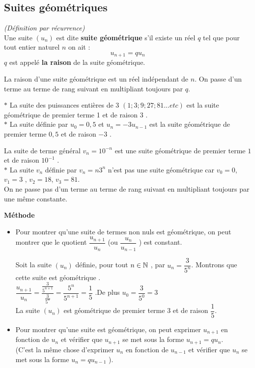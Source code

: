    \subsection{Suites géométriques}
  \begin{definition}
 \textsl{(Définition par récurrence)}\\
Une suite $(u_{n})$ est dite   \textbf{suite géométrique} s'il existe un réel $ q $ tel que   pour tout entier naturel $n$ on ait :  \[u_{n+1}=qu_{n} \]
$q$ est appelé  \textbf{la raison} de la suite géométrique.
\end{definition}
\begin{remark}
La raison d'une suite géométrique est un réel indépendant de $ n. $ On passe d'un terme au terme de rang suivant en multipliant toujours  par $ q. $ 
\end{remark}
\begin{example}

$ \ast $ La suite des  puissances entières de 3 $ (1;3;9;27;81...etc) $ est la suite géométrique  de premier terme 1 et de raison 3 .\\
$ \ast $ La suite définie  par  $ u_{0}=0,5 $ et $ u_{n}=-3u_{n-1} $ est la suite géométrique  de premier terme $0,5   $ et de raison $ -3 $ .
\item La suite de terme général $ v_{n}=10^{-n} $ est une suite géométrique de premier terme $1$ et de raison $ 10^{-1} $ .\\
$ \ast $ La suite $ v_{n} $  définie par $ v_{n}= n3^{n} $ n'est pas une suite géométrique  car $ v_{0}=0$, $v_{1}=3 $ , $v_{2}=18 $, $v_{3}=81 $.\\                                    On ne passe pas d'un terme au terme de rang suivant en multipliant toujours  par une  même constante.

\end{example}
\textbf{Méthode} 
\begin{itemize}
\item [\textbullet] Pour montrer qu'une suite de termes non nuls est géométrique, on peut  montrer que le quotient $ \dfrac{u_{n+1}}{u_{n}} $  (ou $ \dfrac{u_{n}}{u_{n-1}} $ ) est constant.
\begin{example}
 Soit la suite $(u_{n})$ définie, pour tout $ n\in\mathbb{N} $ , par $ u_{n}=\dfrac{3}{5^{n}} $. Montrons que cette suite est géométrique .\\
 $ \dfrac{u_{n+1}}{u_{n}}=\dfrac{\frac{3}{5^{n+1}}}{\frac{3}{5^{n}}}=\dfrac{5^{n}}{5^{n+1}}=\dfrac{1}{5} $ .\quad De plus $ u_{0}=\dfrac{3}{5^{0}}=3 $\\
 La suite $(u_{n})$ est géométrique de premier terme 3 et de raison $ \dfrac{1}{5} $.
 \end{example}
 \item [\textbullet] Pour montrer qu'une suite est géométrique, on peut  exprimer $ u_{n+1} $ en fonction de  $ u_{n}$ et vérifier que  $ u_{n+1} $ se met sous la forme $ u_{n+1}=qu_{n} $. \\
(C'est la même chose d'exprimer $ u_{n} $ en fonction de  $ u_{n-1}$ et vérifier que  $ u_{n} $ se met sous la forme   $ u_{n}=qu_{n-1} $ ). 
 \end{itemize}
